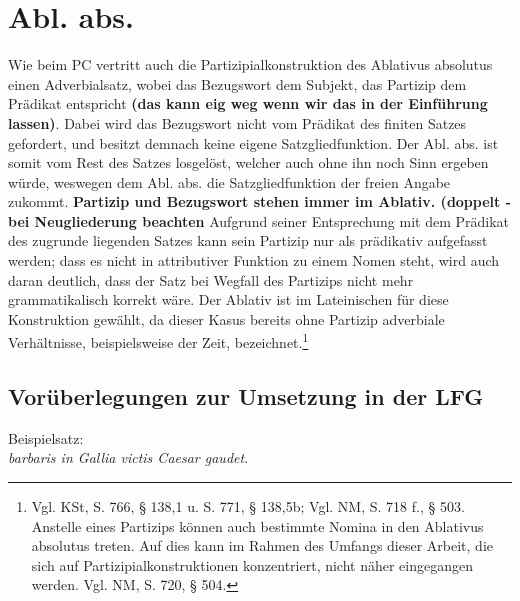 \documentclass[12pt,a4paper]{article}
\begin{document}
\section{Abl. abs.}
Wie beim PC vertritt auch die Partizipialkonstruktion des Ablativus absolutus einen Adverbialsatz, wobei das Bezugswort dem Subjekt, das Partizip dem Prädikat entspricht \textbf{(das kann eig weg wenn wir das in der Einführung lassen)}. Dabei wird das Bezugswort nicht vom Prädikat des finiten Satzes gefordert, und besitzt demnach keine eigene Satzgliedfunktion. Der Abl. abs. ist somit vom Rest des Satzes losgelöst, welcher auch ohne ihn noch Sinn ergeben würde, weswegen dem Abl. abs. die Satzgliedfunktion der freien Angabe zukommt. \textbf{Partizip und Bezugswort stehen immer im Ablativ. (doppelt - bei Neugliederung beachten} Aufgrund seiner Entsprechung mit dem Prädikat des zugrunde liegenden Satzes kann sein Partizip nur als prädikativ aufgefasst werden; dass es nicht in attributiver Funktion zu einem Nomen steht, wird auch daran deutlich, dass der Satz bei Wegfall des Partizips nicht mehr grammatikalisch korrekt wäre. Der Ablativ ist im Lateinischen für diese Konstruktion gewählt, da dieser Kasus bereits ohne Partizip adverbiale Verhältnisse, beispielsweise der Zeit, bezeichnet.\footnote{Vgl. KSt, S. 766, § 138,1 u. S. 771, § 138,5b; Vgl. NM, S. 718 f., § 503. Anstelle eines Partizips können auch bestimmte Nomina in den Ablativus absolutus treten. Auf dies kann im Rahmen des Umfangs dieser Arbeit, die sich auf Partizipialkonstruktionen konzentriert, nicht näher eingegangen werden. Vgl. NM, S. 720, § 504.} \\

\subsection{Vorüberlegungen zur Umsetzung in der LFG}
Beispielsatz: \\
\textit{barbaris in Gallia victis Caesar gaudet.} \\
\end{document}
